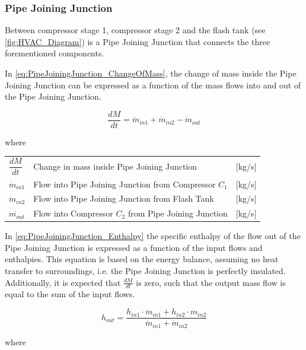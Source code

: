 \subsubsection{Pipe Joining Junction}
Between compressor stage 1, compressor stage 2 and the flash tank (see \cref{fig:HVAC_Diagram}) is a Pipe Joining Junction that connects the three forementioned components.

In \cref{eq:PipeJoiningJunction_ChangeOfMass}, the change of mass inside the Pipe Joining Junction can be expressed as a function of the mass flows into and out of the Pipe Joining Junction.

\begin{equation} \label{eq:PipeJoiningJunction_ChangeOfMass}
	\frac{dM}{dt} = \dot{m}_{in1} + \dot{m}_{in2} - \dot{m}_{out}
\end{equation}


where

\begin{center}
	\begin{tabular}{l p{8cm} l}
		$\dfrac{dM}{dt}$ & Change in mass inside Pipe Joining Junction		 	& [\si{kg}/\si{s}]\\
		$\dot{m}_{in1}$ & Flow into Pipe Joining Junction from Compressor $ C_1 $ 		& [\si{kg}/\si{s}]\\
		$\dot{m}_{in2}$ & Flow into Pipe Joining Junction from Flash Tank 				& [\si{kg}/\si{s}]\\
		$\dot{m_{out}}$ & Flow into Compressor $ C_2 $ from Pipe Joining Junction		& [\si{kg}/\si{s}]\\
	\end{tabular}
\end{center}

In \cref{eq:PipeJoiningJunction_Enthalpy} the specific enthalpy of the flow out of the Pipe Joining Junction is expressed as a function of the input flows and enthalpies. This equation is based on the energy balance, assuming no heat transfer to surroundings, i.e. the Pipe Joining Junction is perfectly insulated. Additionally, it is expected that $\frac{dM}{dt}$ is zero, such that the output mass flow is equal to the sum of the input flows.

\begin{equation} \label{eq:PipeJoiningJunction_Enthalpy}
	h_{out} = \frac{h_{in1} \cdot \dot{m}_{in1} + h_{in2} \cdot \dot{m}_{in2}}{ \dot{m}_{in1} + \dot{m}_{in2} }
\end{equation}

where

